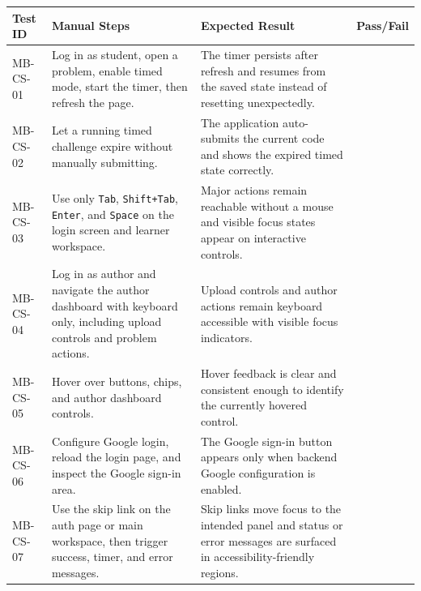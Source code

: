 \begin{tabular}{|p{2.4cm}|p{5.3cm}|p{4.5cm}|p{1.4cm}|}
\hline
\textbf{Test ID} & \textbf{Manual Steps} & \textbf{Expected Result} & \textbf{Pass/Fail} \\
\hline
MB-CS-01 & Log in as student, open a problem, enable timed mode, start the timer, then refresh the page. & The timer persists after refresh and resumes from the saved state instead of resetting unexpectedly. &  \\
\hline
MB-CS-02 & Let a running timed challenge expire without manually submitting. & The application auto-submits the current code and shows the expired timed state correctly. &  \\
\hline
MB-CS-03 & Use only \texttt{Tab}, \texttt{Shift+Tab}, \texttt{Enter}, and \texttt{Space} on the login screen and learner workspace. & Major actions remain reachable without a mouse and visible focus states appear on interactive controls. &  \\
\hline
MB-CS-04 & Log in as author and navigate the author dashboard with keyboard only, including upload controls and problem actions. & Upload controls and author actions remain keyboard accessible with visible focus indicators. &  \\
\hline
MB-CS-05 & Hover over buttons, chips, and author dashboard controls. & Hover feedback is clear and consistent enough to identify the currently hovered control. &  \\
\hline
MB-CS-06 & Configure Google login, reload the login page, and inspect the Google sign-in area. & The Google sign-in button appears only when backend Google configuration is enabled. &  \\
\hline
MB-CS-07 & Use the skip link on the auth page or main workspace, then trigger success, timer, and error messages. & Skip links move focus to the intended panel and status or error messages are surfaced in accessibility-friendly regions. &  \\
\hline
\end{tabular}
